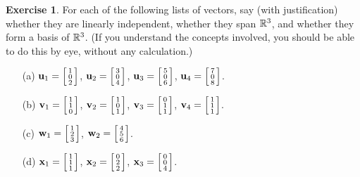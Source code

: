 \documentclass[a4paper]{amsart}
\theoremstyle{definition}
\newtheorem{exercise}{Exercise}
\begin{document}
\begin{exercise}\label{ex-check-dependence}
 For each of the following lists of vectors, say (with justification) whether
 they are linearly independent, whether they span $\R^3$,
 and whether they form a basis of $\R^3$.  (If you
 understand the concepts involved, you should be able to do
 this by eye, without any calculation.)
 \begin{itemize}
  \item[(a)] $\vu_1=\bsm 1\\0\\2\esm$, 
             $\vu_2=\bsm 3\\0\\4\esm$,
             $\vu_3=\bsm 5\\0\\6\esm$,
             $\vu_4=\bsm 7\\0\\8\esm$.
  \item[(b)] $\vv_1=\bsm 1\\1\\0\esm$,
             $\vv_2=\bsm 1\\0\\1\esm$,
             $\vv_3=\bsm 0\\1\\1\esm$,
             $\vv_4=\bsm 1\\1\\1\esm$.
  \item[(c)] $\vw_1=\bsm 1\\2\\3\esm$,
             $\vw_2=\bsm 4\\5\\6\esm$.
  \item[(d)] $\vx_1=\bsm 1\\1\\1\esm$,
             $\vx_2=\bsm 0\\2\\2\esm$,
             $\vx_3=\bsm 0\\0\\4\esm$.
 \end{itemize}
\end{exercise}
\end{document}
